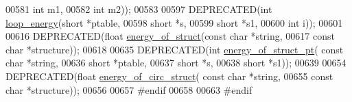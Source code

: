 \begin{DoxyCode}
00581                    \textcolor{keywordtype}{int} m1,
00582                    \textcolor{keywordtype}{int} m2));
00583 
00597 DEPRECATED(\textcolor{keywordtype}{int}   \hyperlink{group__eval_ga507d4fd93f4b398d793ba2402731388d}{loop\_energy}(\textcolor{keywordtype}{short} *ptable,
00598                   \textcolor{keywordtype}{short} *s,
00599                   \textcolor{keywordtype}{short} *s1,
00600                   \textcolor{keywordtype}{int} i));
00601 
00616 DEPRECATED(\textcolor{keywordtype}{float} \hyperlink{group__eval_gac2b37fea2145c94d925a3f33378ef87b}{energy\_of\_struct}(\textcolor{keyword}{const} \textcolor{keywordtype}{char} *\textcolor{keywordtype}{string},
00617                                   \textcolor{keyword}{const} \textcolor{keywordtype}{char} *structure));
00618 
00635 DEPRECATED(\textcolor{keywordtype}{int} \hyperlink{group__eval_ga27ce6f68512d43bf1fe14a06c9d76d5c}{energy\_of\_struct\_pt}( \textcolor{keyword}{const} \textcolor{keywordtype}{char} *\textcolor{keywordtype}{string},
00636                                     \textcolor{keywordtype}{short} *ptable,
00637                                     \textcolor{keywordtype}{short} *s,
00638                                     \textcolor{keywordtype}{short} *s1));
00639 
00654 DEPRECATED(\textcolor{keywordtype}{float} \hyperlink{group__eval_ga657222e2758c46bf13b416ef3032e417}{energy\_of\_circ\_struct}( \textcolor{keyword}{const} \textcolor{keywordtype}{char} *\textcolor{keywordtype}{string},
00655                                         \textcolor{keyword}{const} \textcolor{keywordtype}{char} *structure));
00656 
00657 \textcolor{preprocessor}{#endif}
00658 
00663 \textcolor{preprocessor}{#endif}
\end{DoxyCode}
